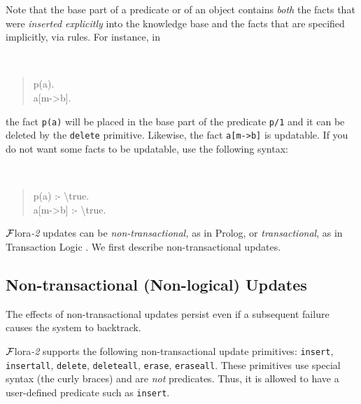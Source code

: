 \documentclass[11pt]{article}
\newcommand{\FLORA}{{\mbox{\sc ${\cal F}${lora}\rm\emph{-2}}}\xspace}
\newcommand{\FLSYSTEM}{\FLORA}
\newcommand{\bs}{\textbackslash}
\begin{document}
Note that the base part of a predicate or of an object contains \emph{both}
the facts that were \emph{inserted explicitly} into the knowledge base and the
facts that are specified implicitly, via rules. For instance, in
{\tt
\begin{quote}
 p(a).\\
 a[m->b].
\end{quote}
}
\noindent
the fact {\tt p(a)} will be placed in the base part of the
predicate {\tt p/1}  and it can be deleted by the {\tt delete}
primitive. Likewise, the fact {\tt a[m->b]} is updatable. If you do not
want some facts to be updatable, use the following syntax:
{\tt
\begin{quote}
 p(a) :- \bs{}true.\\
 a[m->b] :- \bs{}true.
\end{quote}
}


\FLSYSTEM updates can be \emph{non-transactional,} as in Prolog, or
\emph{transactional}, as in Transaction Logic
\cite{trans-chapter-98,trans-tcs94}.  We first describe non-transactional
updates.


\subsection{Non-transactional (Non-logical) Updates}
\label{sec:non-transactional-updates}

%
The effects of non-transactional updates persist even if a subsequent failure
causes the system to backtrack.

\FLSYSTEM supports the following non-transactional update primitives:
{\tt insert}, {\tt insertall}, {\tt delete}, {\tt deleteall},
{\tt erase}, {\tt eraseall}. These primitives use special syntax (the curly
braces) and are \emph{not} predicates. Thus, it is allowed to have a
user-defined predicate such as {\tt insert}.

%
\end{document}
